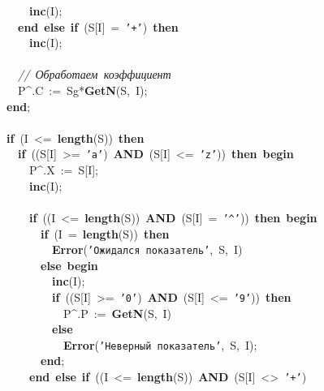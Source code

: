 \mbox{}\ \ \ \ \ \ \ \ \textbf{inc}(I); \\
\mbox{}\ \ \ \ \ \ \textbf{end}\ \textbf{else}\ \textbf{if}\ (S[I]\ =\ \texttt{'+'})\ \textbf{then} \\
\mbox{}\ \ \ \ \ \ \ \ \textbf{inc}(I); \\
\mbox{}\  \\
\mbox{}\ \ \ \ \ \ \textit{//\ Обработаем\ коэффициент} \\
\mbox{}\ \ \ \ \ \ P\textasciicircum{}.C\ :=\ Sg*\textbf{GetN}(S,\ I); \\
\mbox{}\ \ \ \ \textbf{end}; \\
\mbox{} \\
\mbox{}\ \ \ \ \textbf{if}\ (I\ \textless{}=\ \textbf{length}(S))\ \textbf{then} \\
\mbox{}\ \ \ \ \ \ \textbf{if}\ ((S[I]\ \textgreater{}=\ \texttt{'a'})\ \textbf{AND}\ (S[I]\ \textless{}=\ \texttt{'z'}))\ \textbf{then}\ \textbf{begin} \\
\mbox{}\ \ \ \ \ \ \ \ P\textasciicircum{}.X\ :=\ S[I]; \\
\mbox{}\ \ \ \ \ \ \ \ \textbf{inc}(I); \\
\mbox{} \\
\mbox{}\ \ \ \ \ \ \ \ \textbf{if}\ ((I\ \textless{}=\ \textbf{length}(S))\ \textbf{AND}\ (S[I]\ =\ \texttt{'\textasciicircum{}'}))\ \textbf{then}\ \textbf{begin} \\
\mbox{}\ \ \ \ \ \ \ \ \ \ \textbf{if}\ (I\ =\ \textbf{length}(S))\ \textbf{then} \\
\mbox{}\ \ \ \ \ \ \ \ \ \ \ \ \textbf{Error}(\texttt{'Ожидался\ показатель'},\ S,\ I) \\
\mbox{}\ \ \ \ \ \ \ \ \ \ \textbf{else}\ \textbf{begin} \\
\mbox{}\ \ \ \ \ \ \ \ \ \ \ \ \textbf{inc}(I); \\
\mbox{}\ \ \ \ \ \ \ \ \ \ \ \ \textbf{if}\ ((S[I]\ \textgreater{}=\ \texttt{'0'})\ \textbf{AND}\ (S[I]\ \textless{}=\ \texttt{'9'}))\ \textbf{then} \\
\mbox{}\ \ \ \ \ \ \ \ \ \ \ \ \ \ P\textasciicircum{}.P\ :=\ \textbf{GetN}(S,\ I) \\
\mbox{}\ \ \ \ \ \ \ \ \ \ \ \ \textbf{else} \\
\mbox{}\ \ \ \ \ \ \ \ \ \ \ \ \ \ \textbf{Error}(\texttt{'Неверный\ показатель'},\ S,\ I); \\
\mbox{}\ \ \ \ \ \ \ \ \ \ \textbf{end}; \\
\mbox{}\ \ \ \ \ \ \ \ \textbf{end}\ \textbf{else}\ \textbf{if}\ ((I\ \textless{}=\ \textbf{length}(S))\ \textbf{AND}\ (S[I]\ \textless{}\textgreater{}\ \texttt{'+'})\  \\
